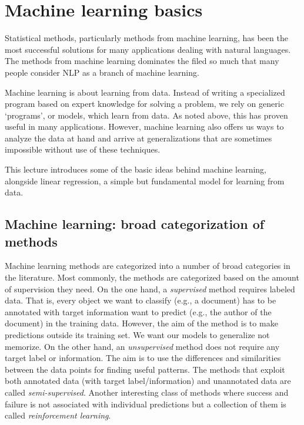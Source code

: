 \chapter{\label{chap:ml-basics}Machine learning basics}

Statistical methods,
particularly methods from machine learning,
has been the most successful solutions for many
applications dealing with natural languages.
The methods from machine learning dominates the filed
so much that many people consider NLP as a branch of machine learning.

Machine learning is about learning from data.
Instead of writing a specialized program based on expert knowledge
for solving a problem, we rely on generic `programs', or  models,
which learn from data.
As noted above, this has proven useful in many applications.
However, machine learning also offers us ways to 
analyze the data at hand and arrive at generalizations
that are sometimes impossible without use of these techniques.

This lecture introduces some of the basic ideas behind machine learning,
alongside linear regression,
a simple but fundamental model for learning from data.

\section{Machine learning: broad categorization of methods}

Machine learning methods are categorized
into a number of broad categories in the literature.
Most commonly, the methods are categorized
based on the amount of supervision they need.
On the one hand,
a \emph{supervised} method requires labeled data.
That is, every object we want to classify (e.g., a document) 
has to be annotated with target information  want to predict
(e.g., the author of the document) in the training data.
However, the aim of the method is
to make predictions outside its training set.
We want our models to generalize not memorize.
On the other hand,
an \emph{unsupervised} method does not require
any target label or information.
The aim is to use the differences and similarities
between the data points for finding useful patterns.
The methods that exploit both annotated data
(with target label/information) and unannotated data
are called \emph{semi-supervised}.
Another interesting class of methods
where success and failure is not associated with 
individual predictions but a collection of them
is called \emph{reinforcement learning}.

